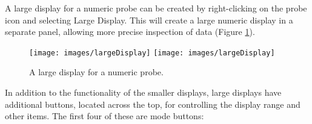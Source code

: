 \documentclass{article}
\begin{document}
\label{LargeDisplay:sec}

A large display for a numeric probe can be created by right-clicking
on the probe icon and selecting {\sf Large Display}. This will create a
large numeric display in a separate panel, allowing more precise
inspection of data (Figure \ref{largeDisplayFig}).

\begin{figure}
\begin{center}
\iflatexml
\texttt{[image: images/largeDisplay]}
\else
\texttt{[image: images/largeDisplay]}
\fi
\end{center}
\caption{A large display for a numeric probe.}%
\label{largeDisplayFig}
\end{figure}

In addition to the functionality of the smaller displays, large
displays have additional buttons, located across the top, for
controlling the display range and other items. The first four of these
are mode buttons:
\end{document}
